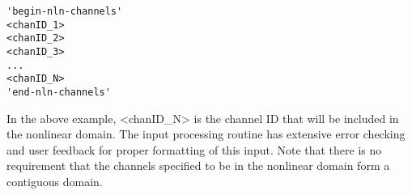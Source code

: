 {
\singlespace
\begin{verbatim}
'begin-nln-channels'
<chanID_1>
<chanID_2>
<chanID_3>
...
<chanID_N>
'end-nln-channels'
\end{verbatim}
}

In the above example, <chanID\_N> is the channel ID that will be included in the nonlinear domain.
The input processing routine has extensive error checking and user feedback for proper formatting of this input.
Note that there is no requirement that the channels specified to be in the nonlinear domain form a contiguous domain.


